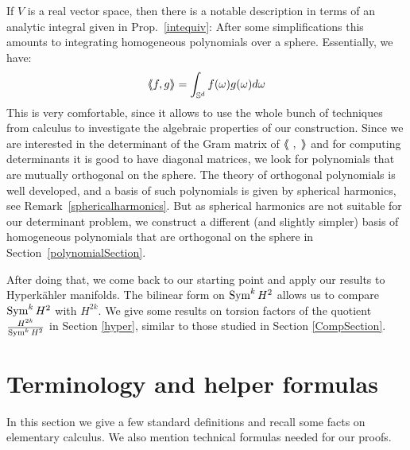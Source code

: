 If $V$ is a real vector space, then there is a notable description in terms of an analytic integral given in Prop.~\ref{intequiv}: After some simplifications this amounts to integrating homogeneous polynomials over a sphere. Essentially, we have:
$$ \left<\!\!\!\:\left< f,g\right>\!\!\!\:\right> = \int_{\mathbb{S}^d} f(\omega)g(\omega)d\omega $$
This is very comfortable, since it allows to use the whole bunch of techniques from calculus to investigate the algebraic properties of our construction.
Since we are interested in the determinant of the Gram matrix of $\bra\ ,\;\ket$
and for computing determinants it is good to have diagonal matrices, we look for polynomials that are mutually orthogonal on the sphere. The theory of orthogonal polynomials is well developed, and a basis of such polynomials is given by spherical harmonics, see Remark~\ref{sphericalharmonics}. But as spherical harmonics are not suitable for our determinant problem, we construct a different (and slightly simpler)
basis of homogeneous polynomials that are orthogonal on the sphere in Section~\ref{polynomialSection}.

After doing that, we come back to our starting point and apply our results to Hyperk\"ahler manifolds. The bilinear form on $\operatorname{Sym}^kH^2$ allows us to compare $\operatorname{Sym}^kH^2$ with $H^{2k}$. We give some results on torsion factors of the quotient $\frac{H^{2k}}{\operatorname{Sym}^kH^2}$ in Section \ref{hyper}, similar to those studied in Section \ref{CompSection}.


\section{Terminology and helper formulas} \label{boring}
In this section 
we give a few standard definitions and recall some facts on elementary calculus. We also mention technical formulas needed for our proofs.

